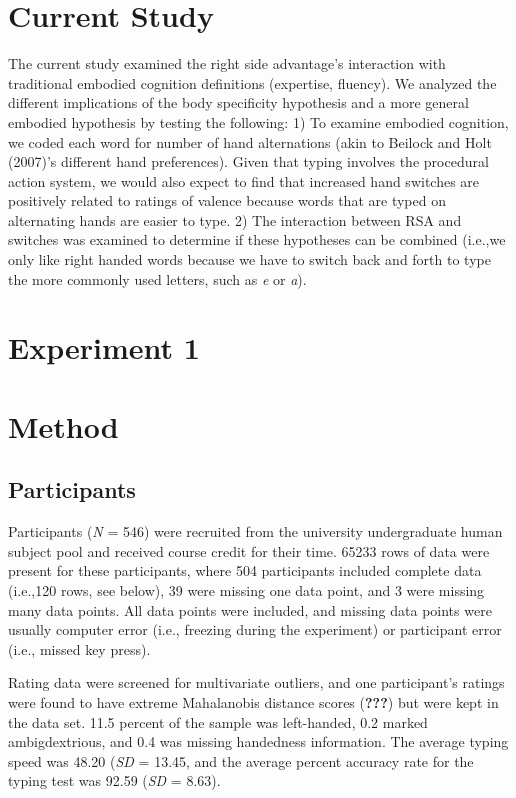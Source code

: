 \documentclass[english,man]{apa6}
\theoremstyle{definition}
\theoremstyle{definition}
\theoremstyle{definition}
\theoremstyle{remark}
\begin{document}
\section{Current Study}\label{current-study}

The current study examined the right side advantage's interaction with
traditional embodied cognition definitions (expertise, fluency). We
analyzed the different implications of the body specificity hypothesis
and a more general embodied hypothesis by testing the following: 1) To
examine embodied cognition, we coded each word for number of hand
alternations (akin to Beilock and Holt (2007)'s different hand
preferences). Given that typing involves the procedural action system,
we would also expect to find that increased hand switches are positively
related to ratings of valence because words that are typed on
alternating hands are easier to type. 2) The interaction between RSA and
switches was examined to determine if these hypotheses can be combined
(i.e.,we only like right handed words because we have to switch back and
forth to type the more commonly used letters, such as \emph{e} or
\emph{a}).

\section{Experiment 1}\label{experiment-1}

\section{Method}\label{method}

\subsection{Participants}\label{participants}

Participants (\emph{N} = 546) were recruited from the university
undergraduate human subject pool and received course credit for their
time. 65233 rows of data were present for these participants, where 504
participants included complete data (i.e.,120 rows, see below), 39 were
missing one data point, and 3 were missing many data points. All data
points were included, and missing data points were usually computer
error (i.e., freezing during the experiment) or participant error (i.e.,
missed key press).

Rating data were screened for multivariate outliers, and one
participant's ratings were found to have extreme Mahalanobis distance
scores ({\textbf{???}}) but were kept in the data set. 11.5 percent of
the sample was left-handed, 0.2 marked ambigdextrious, and 0.4 was
missing handedness information. The average typing speed was 48.20
(\emph{SD} = 13.45, and the average percent accuracy rate for the typing
test was 92.59 (\emph{SD} = 8.63).
\end{document}
